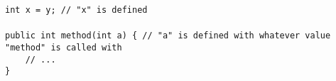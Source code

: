 \verb$int x = y; // "x" is defined$\\
\verb$$\\
\verb$public int method(int a) { // "a" is defined with whatever value "method" is called with$\\
\verb$    // ...$\\
\verb$}$\\